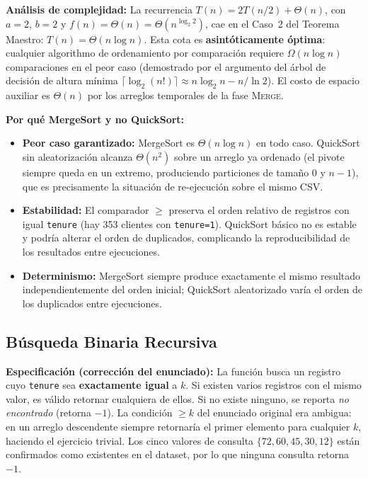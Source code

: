 \documentclass[11pt, a4paper]{article}
\begin{document}
\textbf{Análisis de complejidad:} La recurrencia $T(n)=2T(n/2)+\Theta(n)$, con $a=2$,
$b=2$ y $f(n)=\Theta(n)=\Theta(n^{\log_2 2})$, cae en el Caso~2 del Teorema Maestro:
$T(n)=\Theta(n\log n)$. Esta cota es \textbf{asintóticamente óptima}: cualquier
algorithmo de ordenamiento por comparación requiere $\Omega(n\log n)$ comparaciones en
el peor caso (demostrado por el argumento del árbol de decisión de altura mínima
$\lceil\log_2(n!)\rceil\approx n\log_2 n - n/\ln 2$). El costo de espacio auxiliar es
$\Theta(n)$ por los arreglos temporales de la fase \textsc{Merge}.

\textbf{Por qué MergeSort y no QuickSort:}
\begin{itemize}
  \item \textbf{Peor caso garantizado:} MergeSort es $\Theta(n\log n)$ en todo caso.
        QuickSort sin aleatorización alcanza $\Theta(n^2)$ sobre un arreglo ya ordenado
        (el pivote siempre queda en un extremo, produciendo particiones de tamaño $0$ y
        $n-1$), que es precisamente la situación de re-ejecución sobre el mismo CSV.
  \item \textbf{Estabilidad:} El comparador $\geq$ preserva el orden relativo de registros
        con igual \texttt{tenure} (hay 353 clientes con \texttt{tenure=1}). QuickSort
        básico no es estable y podría alterar el orden de duplicados, complicando la
        reproducibilidad de los resultados entre ejecuciones.
  \item \textbf{Determinismo:} MergeSort siempre produce exactamente el mismo resultado
        independientemente del orden inicial; QuickSort aleatorizado varía el orden de
        los duplicados entre ejecuciones.
\end{itemize}

\subsection{Búsqueda Binaria Recursiva}

\textbf{Especificación (corrección del enunciado):} La función busca un registro cuyo
\texttt{tenure} sea \textbf{exactamente igual} a $k$. Si existen varios registros con
el mismo valor, es válido retornar cualquiera de ellos. Si no existe ninguno, se reporta
\textit{no encontrado} (retorna $-1$). La condición $\geq k$ del enunciado original era
ambigua: en un arreglo descendente siempre retornaría el primer elemento para cualquier $k$,
haciendo el ejercicio trivial. Los cinco valores de consulta $\{72,60,45,30,12\}$ están
confirmados como existentes en el dataset, por lo que ninguna consulta retorna $-1$.
\end{document}
